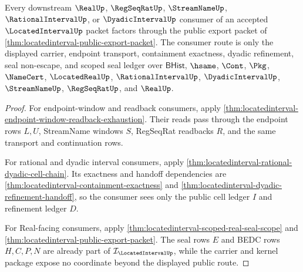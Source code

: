 \begin{theorem}
\label{thm:locatedinterval-public-consumer-route}
Every downstream $\RealUp$, $\RegSeqRatUp$, $\StreamNameUp$, $\RationalIntervalUp$, or $\DyadicIntervalUp$ consumer of an accepted $\LocatedIntervalUp$ packet factors through the public export packet of \autoref{thm:locatedinterval-public-export-packet}. The consumer route is only the displayed carrier, endpoint transport, containment exactness, dyadic refinement, seal non-escape, and scoped seal ledger over $\mathsf{BHist}$, $\hsame$, $\Cont$, $\Pkg$, $\NameCert$, $\LocatedRealUp$, $\RationalIntervalUp$, $\DyadicIntervalUp$, $\StreamNameUp$, $\RegSeqRatUp$, and $\RealUp$.
\end{theorem}
\begin{proof}
For endpoint-window and readback consumers, apply \autoref{thm:locatedinterval-endpoint-window-readback-exhaustion}. Their reads pass through the endpoint rows $L,U$, StreamName windows $S$, RegSeqRat readbacks $R$, and the same transport and continuation rows.

For rational and dyadic interval consumers, apply \autoref{thm:locatedinterval-rational-dyadic-cell-chain}. Its exactness and handoff dependencies are \autoref{thm:locatedinterval-containment-exactness} and \autoref{thm:locatedinterval-dyadic-refinement-handoff}, so the consumer sees only the public cell ledger $I$ and refinement ledger $D$.

For Real-facing consumers, apply \autoref{thm:locatedinterval-scoped-real-seal-scope} and \autoref{thm:locatedinterval-public-export-packet}. The seal rows $E$ and BEDC rows $H,C,P,N$ are already part of $\mathcal{I}_{\LocatedIntervalUp}$, while the carrier and kernel package expose no coordinate beyond the displayed public route.
\end{proof}

